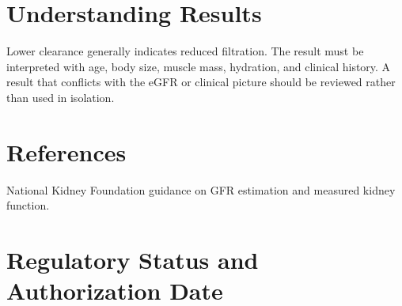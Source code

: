 \section*{Understanding Results}
Lower clearance generally indicates reduced filtration. The result must be interpreted with age, body size, muscle mass, hydration, and clinical history. A result that conflicts with the eGFR or clinical picture should be reviewed rather than used in isolation.

\section*{References}
National Kidney Foundation guidance on GFR estimation and measured kidney function.

\clearpage


\section*{Regulatory Status and Authorization Date}

\clearpage
